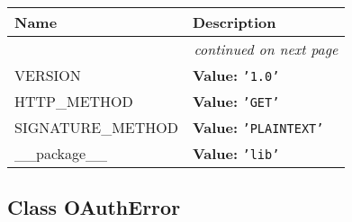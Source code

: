     \vspace{-1cm}
\hspace{\varindent}\begin{longtable}{|p{\varnamewidth}|p{\vardescrwidth}|l}
\cline{1-2}
\cline{1-2} \centering \textbf{Name} & \centering \textbf{Description}& \\
\cline{1-2}
\endhead\cline{1-2}\multicolumn{3}{r}{\small\textit{continued on next page}}\\\endfoot\cline{1-2}
\endlastfoot\raggedright V\-E\-R\-S\-I\-O\-N\- & \raggedright \textbf{Value:} 
{\tt \texttt{'}\texttt{1.0}\texttt{'}}&\\
\cline{1-2}
\raggedright H\-T\-T\-P\-\_\-M\-E\-T\-H\-O\-D\- & \raggedright \textbf{Value:} 
{\tt \texttt{'}\texttt{GET}\texttt{'}}&\\
\cline{1-2}
\raggedright S\-I\-G\-N\-A\-T\-U\-R\-E\-\_\-M\-E\-T\-H\-O\-D\- & \raggedright \textbf{Value:} 
{\tt \texttt{'}\texttt{PLAINTEXT}\texttt{'}}&\\
\cline{1-2}
\raggedright \_\-\_\-p\-a\-c\-k\-a\-g\-e\-\_\-\_\- & \raggedright \textbf{Value:} 
{\tt \texttt{'}\texttt{lib}\texttt{'}}&\\
\cline{1-2}
\end{longtable}



\subsection{Class OAuthError}

